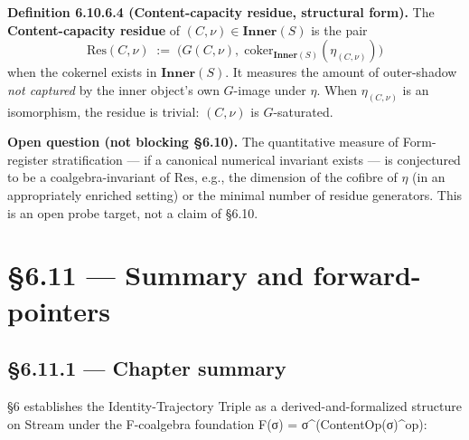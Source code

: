 \documentclass[11pt, openany]{book}
\newcommand{\sectionbreak}{\clearpage}
\begin{document}
\textbf{Definition 6.10.6.4 (Content-capacity residue, structural form).} The \textbf{Content-capacity residue} of $(C, \nu) \in \mathbf{Inner}(S)$ is the pair
\[
\mathrm{Res}(C, \nu) \;:=\; \bigl( G(C, \nu), \; \mathrm{coker}_{\mathbf{Inner}(S)}(\eta_{(C, \nu)}) \bigr)
\]
when the cokernel exists in $\mathbf{Inner}(S)$. It measures the amount of outer-shadow \textit{not captured} by the inner object's own $G$-image under $\eta$. When $\eta_{(C, \nu)}$ is an isomorphism, the residue is trivial: $(C, \nu)$ is $G$-saturated.

\textbf{Open question (not blocking §6.10).} The quantitative measure of Form-register stratification --- if a canonical numerical invariant exists --- is conjectured to be a coalgebra-invariant of $\mathrm{Res}$, e.g., the dimension of the cofibre of $\eta$ (in an appropriately enriched setting) or the minimal number of residue generators. This is an open probe target, not a claim of §6.10.

\sectionbreak

\section{§6.11 --- Summary and forward-pointers}

\subsection{§6.11.1 --- Chapter summary}

§6 establishes the Identity-Trajectory Triple as a derived-and-formalized structure on Stream under the F-coalgebra foundation F(σ) = σ\textasciicircum{}(ContentOp(σ)\textasciicircum{}op):
\end{document}
